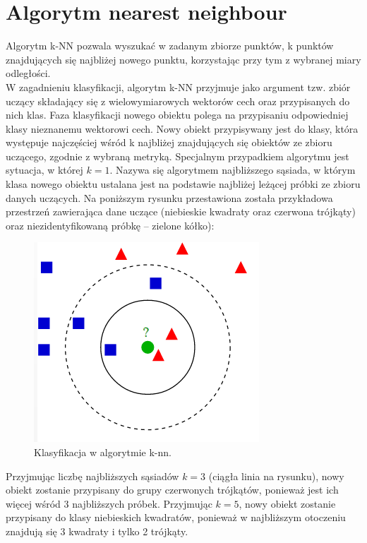 \documentclass[11pt, a4paper, titlepage]{report}
\begin{document}
\section{Algorytm nearest neighbour}
\label{sec:Algorytm nearest neighbour}
Algorytm k-NN pozwala wyszukać w zadanym zbiorze punktów, k punktów znajdujących się najbliżej nowego punktu, korzystając przy tym z wybranej miary odległości.\\
W zagadnieniu klasyfikacji, algorytm k-NN przyjmuje jako argument tzw. zbiór uczący składający się z wielowymiarowych wektorów cech oraz przypisanych do nich klas. Faza klasyfikacji nowego obiektu polega na przypisaniu odpowiedniej klasy nieznanemu wektorowi cech. Nowy obiekt przypisywany jest do klasy, która występuje najczęściej wśród k najbliżej znajdujących się obiektów ze zbioru uczącego, zgodnie z wybraną metryką. Specjalnym przypadkiem algorytmu jest sytuacja, w której $k = 1$. Nazywa się algorytmem najbliższego sąsiada, w którym klasa nowego obiektu ustalana jest na podstawie najbliżej leżącej próbki ze zbioru danych uczących. Na poniższym rysunku przestawiona została przykładowa przestrzeń zawierająca dane uczące (niebieskie kwadraty oraz czerwona trójkąty) oraz niezidentyfikowaną próbkę – zielone kółko):
\begin{figure}[h]
  \centering
  \includegraphics[scale=0.5]{obrazki/knn}
  \caption{Klasyfikacja w algorytmie k-nn.}
\end{figure}

Przyjmując liczbę najbliższych sąsiadów $k = 3$ (ciągła linia na rysunku),  nowy obiekt zostanie przypisany do grupy czerwonych trójkątów, ponieważ jest ich więcej wśród 3 najbliższych próbek. Przyjmując $k = 5$, nowy obiekt zostanie przypisany do klasy niebieskich kwadratów, ponieważ w najbliższym otoczeniu znajdują się 3 kwadraty i tylko 2 trójkąty.
\end{document}
